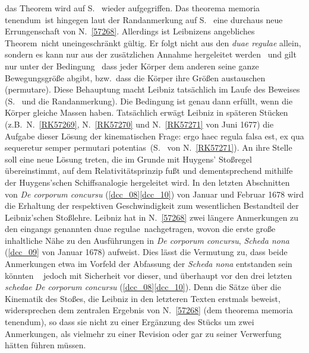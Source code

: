 \begin{ledgroup}
{%
das} Theorem wird auf S.~  wieder aufgegriffen.
%
%
Das \glqq theorema memoria tenendum\grqq\ ist hingegen laut der Randanmerkung auf S.~ eine durchaus neue Errungenschaft von N.~\ref{57268}. %
%
\pend
\newpage
\pstart
Allerdings ist Leibnizens angebliches \glqq Theorem\grqq\  nicht uneingeschränkt gültig.
%
Er folgt nicht aus den \textit{duae regulae} allein, sondern es kann nur aus der zusätzlichen Annahme 
%
hergeleitet werden \textendash\ und gilt nur unter der Bedingung \textendash\ dass jeder Körper dem 
%
anderen seine ganze Bewegungsgröße abgibt, bzw.\ dass die Körper ihre Größen austauschen 
%
(\glqq permutare\grqq). Diese Behauptung macht Leibniz tatsächlich im Laufe des Beweises 
%
(S.~ und die Randanmerkung). 
%
Die Bedingung ist genau dann erfüllt, wenn die Körper gleiche Massen haben.
%
Tatsächlich erwägt Leibniz in späteren Stücken (z.B.\ N.~\ref{RK57269}, N.~\ref{RK57270} und N.~\ref{RK57271} von Juni 1677) 
%
die Aufgabe dieser Lösung der kinematischen Frage:
%
\glqq ergo haec regula falsa est, ex qua sequeretur semper permutari potentias\grqq\ (S.~ von N.~\ref{RK57271}).
%
An ihre Stelle soll eine neue Lösung treten, die im Grunde mit \protect{}Huygens' Stoßregel 
%
übereinstimmt, auf dem Relativitätsprinzip fußt und dementsprechend mithilfe der Huygens'schen Schiffsanalogie hergeleitet wird.
%
In den letzten Abschnitten von \textit{De corporum concursu} (\ref{dcc_08}\textendash\ref{dcc_10}) 
%
von Januar und Februar 1678
%
wird die Erhaltung der respektiven Geschwindigkeit zum wesentlichen Bestandteil der Leibniz'schen Stoßlehre.
\pend
%
\pstart
%
Leibniz hat in N.~\ref{57268} zwei längere Anmerkungen zu den eingangs genannten \glqq duae regulae\grqq\  nachgetragen, 
%
wovon die erste große inhaltliche Nähe zu den Ausführungen in \textit{De corporum concursu}, \textit{Scheda nona} 
%
(\ref{dcc_09} von Januar 1678) aufweist. 
%
Dies lässt die Vermutung zu, dass beide Anmerkungen etwa im Vorfeld der Abfassung der \textit{Scheda nona} entstanden sein könnten \textendash\ 
% 
jedoch mit Sicherheit vor dieser, und überhaupt vor den drei letzten \textit{schedae} \textit{De corporum concursu} (\ref{dcc_08}\textendash\ref{dcc_10}).
%
Denn die Sätze über die Kinematik des Stoßes, die Leibniz in den letzteren Texten erstmals beweist,
%
widersprechen dem zentralen Ergebnis von N.~\ref{57268} (dem \glqq theorema memoria tenendum\grqq),
%
so dass sie nicht zu einer Ergänzung des Stücks um zwei Anmerkungen, 
%
als vielmehr zu einer Revision oder gar zu seiner Verwerfung hätten führen müssen.
\pend
%
\end{ledgroup}
